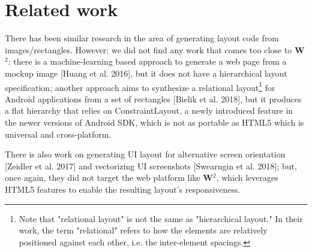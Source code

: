 \documentclass[runningheads]{llncs}
\begin{document}
\section{Related work}
There has been similar research in the area of generating layout code from images/rectangles. However; we did not find any work that comes too close to \textbf{W}$^2$: there is a machine-learning based approach to generate a web page from a mockup image [Huang et al. 2016], but it does not have a hierarchical layout specification; another approach aims to synthesize a relational layout\protect\footnote{ Note that "relational layout" is not the same as "hierarchical layout." In their work, the term "relational" refers to how the elements are relatively positioned against each other, i.e. the inter-element spacings.} for Android applications from a set of rectangles [Bielik et al. 2018], but it produces a flat hierarchy that relies on ConstraintLayout, a newly introduced feature in the newer versions of Android SDK, which is not as portable as HTML5 which is universal and cross-platform.

There is also work on generating UI layout for alternative screen orientation [Zeidler et al. 2017] and vectorizing UI screenshots [Swearngin et al. 2018]; but, once again, they did not target the web platform like \textbf{W}$^2$, which leverages HTML5 features to enable the resulting layout's responsiveness.

\end{document}
